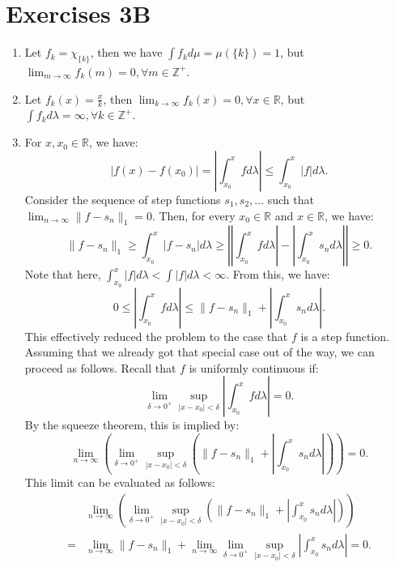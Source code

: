 
\section{Exercises 3B} %
\label{sec:Exercises 3B}

\begin{enumerate}[label=\textbf{3B.\arabic*}]
  \item Let \( f_{k} = \chi_{\{k\}  } \), then we have \( \int f_{k}d\mu = \mu
    (\{k\}  ) = 1 \), but \( \lim_{m \to \infty} f_{k}(m) = 0, \forall m \in
    \mathbb{Z}^{+} \).
  \item Let \( f_{k}(x) = \frac{x}{k} \), then \( \lim_{k \to \infty} f_{k}(x) =
    0, \forall  x \in \mathbb{R}\), but \( \int f_{k}d\lambda  = \infty, \forall k
    \in \mathbb{Z}^{+} \).
  \item For \( x, x_{0} \in \mathbb{R} \), we have:
    \[
      |f(x)-f(x_{0})| = \left| \int _{x_{0}}^{x} fd\lambda \right| \le \int
      _{x_{0}}^{x} |f|d\lambda
    .\] 
    Consider the sequence of step functions \( s_{1}, s_{2}, \ldots  \) such
    that \( \lim_{n \to \infty} \|f - s_{n}\|_{1} = 0 \). Then, for every \(
    x_{0}  \in \mathbb{R} \) and \( x \in \mathbb{R} \), we have:
    \[
      \|f-s_{n}\|_{1} \ge \int _{x_{0}}^{x} |f-s_{n}|d\lambda \ge 
      \left| \left| \int _{x_{0}}^{x} fd\lambda \right|
      - \left|  \int _{x_{0}}^{x} s_{n}d\lambda \right| \right| 
      \ge 0
    .\] Note that here, \( \int _{x_{0}}^{x} |f|d\lambda < \int |f|d\lambda <
    \infty \). From this, we have:
    \[
      0 \le \left| \int _{x_{0}}^{x} fd\lambda \right| \le
      \|f-s_{n}\|_{1}+\left| \int _{x_{0}}^{x}s_{n}d\lambda \right| 
    .\] This effectively reduced the problem to the case that \( f \) is a step
    function. Assuming that we already got that special case out of the way, we
    can proceed as follows. Recall that \( f \) is uniformly continuous if:
    \[
      \lim_{\delta \to  0^{+}} \sup _{|x-x_{0}|<\delta} \left| \int _{x_{0}}^{x}
      fd\lambda\right|  = 0
    .\] 
    By the squeeze theorem, this is implied by:
    \[
      \lim_{n \to \infty} \left( \lim_{\delta \to  0^{+}} \sup
      _{|x-x_{0}|<\delta} \left( \|f-s_{n}\|_{1} + \left| \int _{x_{0}}^{x}
    s_{n}d\lambda \right|  \right)  \right)  = 0
    .\] 
    This limit can be evaluated as follows:
    \begin{align*}
      &\lim_{n \to \infty} \left( \lim_{\delta \to  0^{+}} \sup
      _{|x-x_{0}|<\delta} \left( \|f-s_{n}\|_{1} + \left| \int _{x_{0}}^{x}
    s_{n}d\lambda \right|  \right)  \right)  \\
      = &\lim_{n \to \infty}  
    \|f-s_{n}\|_{1} + \lim_{n \to \infty}
        \lim_{\delta \to  0^{+}} \sup _{|x-x_{0}| < \delta}
    \left| \int _{x_{0}}^{x} s_{n}d\lambda \right| = 0
    .\end{align*}


\end{enumerate}
